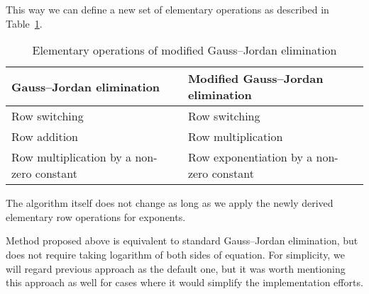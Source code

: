 This way we can define a new set of elementary operations as described in Table~\ref{tab:modified_elementary}.
\begin{table}[h!]
\begin{center}
\begin{tabular}{|l|p{7cm}|}
    \hline
    Gauss--Jordan elimination & Modified Gauss--Jordan elimination \\\hline\hline
    Row switching & Row switching \\\hline
    Row addition & Row multiplication \\\hline
    Row multiplication by a non-zero constant & Row exponentiation by a non-zero constant \\\hline
\end{tabular}
	    \caption{Elementary operations of modified Gauss--Jordan elimination}
		\label{tab:modified_elementary}
\end{center}
\end{table}
The algorithm itself does not change as long as we apply the newly derived elementary row operations for exponents.

Method proposed above is equivalent to standard Gauss--Jordan elimination, but does not require taking logarithm of both sides of equation.
For simplicity, we will regard previous approach as the default one, but it was worth mentioning this approach as well for cases where it would simplify the implementation efforts.
